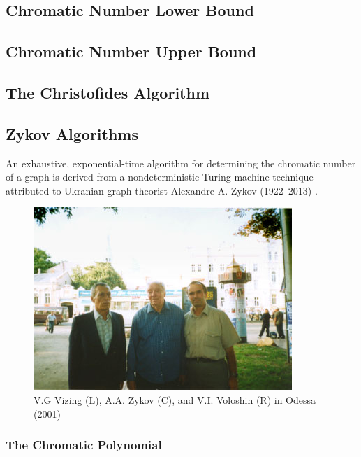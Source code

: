 \subsection{Chromatic Number Lower Bound}\label{sec:sub:lower}

\subsection{Chromatic Number Upper Bound}\label{sec:sub:upper}

\subsection{The Christofides Algorithm}\label{sec:christofides}

\subsection{Zykov Algorithms}\label{sec:zykov}

An exhaustive, exponential-time algorithm for determining the chromatic number of a graph is derived from a
nondeterministic Turing machine technique attributed to Ukranian graph theorist Alexandre A. Zykov (1922--2013)
\cite{obit}.

\begin{figure}[h]
  \label{fig:zykov}
  \begin{center}
    \includegraphics{zykov}
  \end{center}
  \caption{V.G Vizing (L), A.A. Zykov (C), and V.I. Voloshin (R) in Odessa (2001) \cite{voloshin}}
\end{figure}

\subsubsection{The Chromatic Polynomial}


